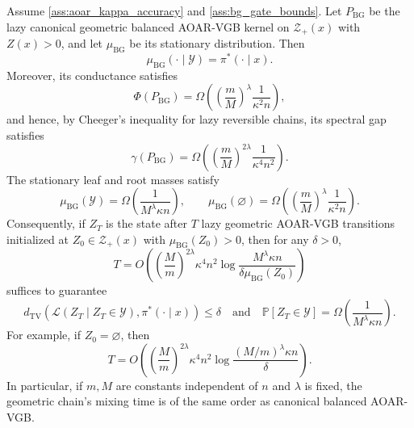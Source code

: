 \documentclass{article}
\numberwithin{theorem}{section}
\numberwithin{proposition}{section}
\numberwithin{corollary}{section}
\numberwithin{lemma}{section}
\numberwithin{conjecture}{section}
\numberwithin{remark}{section}
\numberwithin{definition}{section}
\numberwithin{assumption}{section}
\numberwithin{example}{section}
\newcommand{\calY}{{\mathcal{Y}}}
\newcommand{\calZ}{{\mathcal{Z}}}
\begin{document}
\begin{theorem}
\label{thm:canonical_geometric_balanced_mixing}
Assume \cref{ass:aoar_kappa_accuracy} and \cref{ass:bg_gate_bounds}. Let $P_{\mathrm{BG}}$ be the lazy canonical geometric balanced AOAR-VGB kernel on $\calZ_+(x)$ with $Z(x)>0$, and let $\mu_{\mathrm{BG}}$ be its stationary distribution. Then
\begin{equation*}
    \mu_{\mathrm{BG}}(\cdot\mid\calY)=\pi^*(\cdot\mid x).
\end{equation*}
Moreover, its conductance satisfies
\begin{equation*}
    \Phi(P_{\mathrm{BG}})
    =
    \Omega\!\left(
        \left(\frac{m}{M}\right)^\lambda
        \frac{1}{\kappa^2 n}
    \right),
\end{equation*}
and hence, by Cheeger's inequality for lazy reversible chains, its spectral gap satisfies
\begin{equation*}
    \gamma(P_{\mathrm{BG}})
    =
    \Omega\!\left(
        \left(\frac{m}{M}\right)^{2\lambda}
        \frac{1}{\kappa^4 n^2}
    \right).
\end{equation*}
The stationary leaf and root masses satisfy
\begin{equation*}
    \mu_{\mathrm{BG}}(\calY)
    =
    \Omega\!\left(
        \frac{1}{M^\lambda\kappa n}
    \right),
    \qquad
    \mu_{\mathrm{BG}}(\varnothing)
    =
    \Omega\!\left(
        \left(\frac{m}{M}\right)^\lambda
        \frac{1}{\kappa^2 n}
    \right).
\end{equation*}
Consequently, if $Z_T$ is the state after $T$ lazy geometric AOAR-VGB transitions initialized at $Z_0\in\calZ_+(x)$ with $\mu_{\mathrm{BG}}(Z_0)>0$, then for any $\delta>0$,
\begin{equation*}
    T
    =
    O\!\left(
        \left(\frac{M}{m}\right)^{2\lambda}
        \kappa^4 n^2
        \log
        \frac{M^\lambda\kappa n}{\delta \mu_{\mathrm{BG}}(Z_0)}
    \right)
\end{equation*}
suffices to guarantee
\begin{equation*}
    d_{\mathrm{TV}}
    \left(
        \mathcal L(Z_T\mid Z_T\in\calY),
        \pi^*(\cdot\mid x)
    \right)
    \le
    \delta \quad \text{and} \quad \mathbb{P}[Z_T \in \calY] =\Omega\!\left(
        \frac{1}{M^\lambda\kappa n}
    \right).
\end{equation*}
For example, if $Z_0 = \varnothing$, then \begin{equation*}
    T
    =
    O\!\left(
        \left(\frac{M}{m}\right)^{2\lambda}
        \kappa^4 n^2
        \log
        \frac{(M/m)^\lambda\kappa n}{\delta}
    \right).
\end{equation*}
In particular, if $m,M$ are constants independent of $n$ and $\lambda$ is fixed, the geometric chain's mixing time is of the same order as canonical balanced AOAR-VGB.
\end{theorem}
\end{document}
